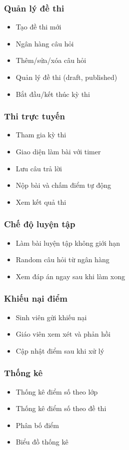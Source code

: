 ﻿\documentclass[12pt,a4paper]{report}
\begin{document}
\subsubsection{Quản lý đề thi}
\begin{itemize}
    \item Tạo đề thi mới
    \item Ngân hàng câu hỏi
    \item Thêm/sửa/xóa câu hỏi
    \item Quản lý đề thi (draft, published)
    \item Bắt đầu/kết thúc kỳ thi
\end{itemize}

\subsubsection{Thi trực tuyến}
\begin{itemize}
    \item Tham gia kỳ thi
    \item Giao diện làm bài với timer
    \item Lưu câu trả lời
    \item Nộp bài và chấm điểm tự động
    \item Xem kết quả thi
\end{itemize}

\subsubsection{Chế độ luyện tập}
\begin{itemize}
    \item Làm bài luyện tập không giới hạn
    \item Random câu hỏi từ ngân hàng
    \item Xem đáp án ngay sau khi làm xong
\end{itemize}

\subsubsection{Khiếu nại điểm}
\begin{itemize}
    \item Sinh viên gửi khiếu nại
    \item Giáo viên xem xét và phản hồi
    \item Cập nhật điểm sau khi xử lý
\end{itemize}

\subsubsection{Thống kê}
\begin{itemize}
    \item Thống kê điểm số theo lớp
    \item Thống kê điểm số theo đề thi
    \item Phân bố điểm
    \item Biểu đồ thống kê
\end{itemize}
\end{document}

